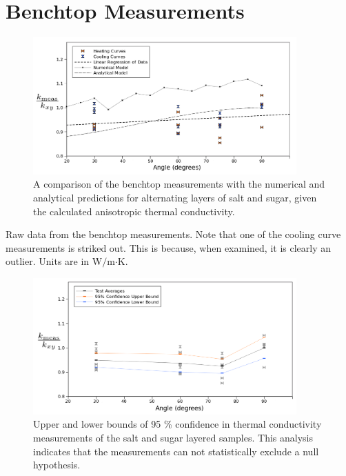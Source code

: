 \section{Benchtop Measurements}

\begin{figure}[h]
\centering
\includegraphics[width=0.9\textwidth]{fig/test_results.png}
\caption{A comparison of the benchtop measurements with the numerical and
analytical predictions for alternating layers of salt and sugar, given the
calculated anisotropic thermal conductivity.}
\label{fig:test_results}
\end{figure}

\begin{table}[h]
\centering

\caption{Raw data from the benchtop measurements. Note that one of the cooling curve measurements is striked out. This is because, when examined, it is clearly an outlier. Units are in W\(/\)m\(\cdot\)K.}
\label{tab:powders}
\end{table}


\begin{figure}[h]
\centering
\includegraphics[width=0.9\textwidth]{fig/test_results_confidence.png}
\caption{Upper and lower bounds of 95 \% confidence in thermal conductivity measurements of the salt and sugar layered samples. This analysis 
indicates that the measurements can not statistically exclude a null hypothesis.}
\label{fig:test_confidence}
\end{figure}

